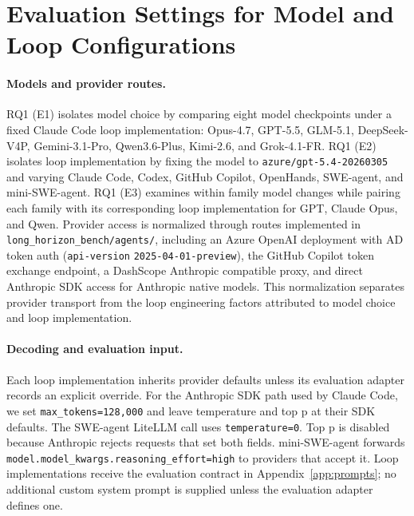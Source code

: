\section{Evaluation Settings for Model and Loop Configurations}\label{app:exp-settings}

\paragraph{Models and provider routes.}
RQ1 (E1) isolates model choice by comparing eight model checkpoints under a fixed Claude Code loop implementation: Opus-4.7, GPT-5.5, GLM-5.1, DeepSeek-V4P, Gemini-3.1-Pro, Qwen3.6-Plus, Kimi-2.6, and Grok-4.1-FR.
RQ1 (E2) isolates loop implementation by fixing the model to \texttt{azure/gpt-5.4-20260305} and varying Claude Code, Codex, GitHub Copilot, OpenHands, SWE-agent, and mini-SWE-agent.
RQ1 (E3) examines within family model changes while pairing each family with its corresponding loop implementation for GPT, Claude Opus, and Qwen.
Provider access is normalized through routes implemented in \texttt{long\_horizon\_bench/agents/}, including an Azure OpenAI deployment with AD token auth (\texttt{api-version} \texttt{2025-04-01-preview}), the GitHub Copilot token exchange endpoint, a DashScope Anthropic compatible proxy, and direct Anthropic SDK access for Anthropic native models. This normalization separates provider transport from the loop engineering factors attributed to model choice and loop implementation.

\paragraph{Decoding and evaluation input.}
Each loop implementation inherits provider defaults unless its evaluation adapter records an explicit override. For the Anthropic SDK path used by Claude Code, we set \texttt{max\_tokens=128{,}000} and leave temperature and top p at their SDK defaults. The SWE-agent LiteLLM call uses \texttt{temperature=0}. Top p is disabled because Anthropic rejects requests that set both fields. mini-SWE-agent forwards \texttt{model.model\_kwargs.reasoning\_effort=high} to providers that accept it. Loop implementations receive the evaluation contract in Appendix~\ref{app:prompts}; no additional custom system prompt is supplied unless the evaluation adapter defines one.

